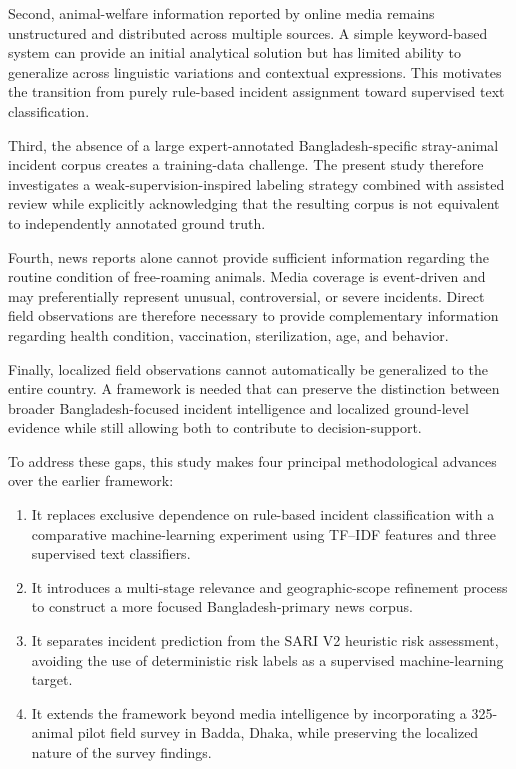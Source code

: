\documentclass[conference]{IEEEtran}
\begin{document}
Second, animal-welfare information reported by online media remains
unstructured and distributed across multiple sources. A simple keyword-based
system can provide an initial analytical solution but has limited ability to
generalize across linguistic variations and contextual expressions. This
motivates the transition from purely rule-based incident assignment toward
supervised text classification.

Third, the absence of a large expert-annotated Bangladesh-specific
stray-animal incident corpus creates a training-data challenge. The present
study therefore investigates a weak-supervision-inspired labeling strategy
combined with assisted review while explicitly acknowledging that the
resulting corpus is not equivalent to independently annotated ground truth.

Fourth, news reports alone cannot provide sufficient information regarding
the routine condition of free-roaming animals. Media coverage is event-driven
and may preferentially represent unusual, controversial, or severe incidents.
Direct field observations are therefore necessary to provide complementary
information regarding health condition, vaccination, sterilization, age, and
behavior.

Finally, localized field observations cannot automatically be generalized to
the entire country. A framework is needed that can preserve the distinction
between broader Bangladesh-focused incident intelligence and localized
ground-level evidence while still allowing both to contribute to
decision-support.

To address these gaps, this study makes four principal methodological
advances over the earlier framework:

\begin{enumerate}
    \item It replaces exclusive dependence on rule-based incident
    classification with a comparative machine-learning experiment using
    TF--IDF features and three supervised text classifiers.

    \item It introduces a multi-stage relevance and geographic-scope
    refinement process to construct a more focused Bangladesh-primary news
    corpus.

    \item It separates incident prediction from the SARI V2 heuristic risk
    assessment, avoiding the use of deterministic risk labels as a supervised
    machine-learning target.

    \item It extends the framework beyond media intelligence by incorporating
    a 325-animal pilot field survey in Badda, Dhaka, while preserving the
    localized nature of the survey findings.
\end{enumerate}
\end{document}
